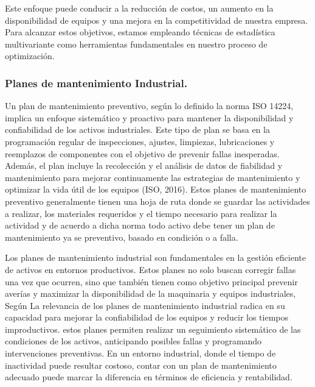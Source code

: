 \documentclass[
  11pt,
  bookmarksnumbered]{article}
\begin{document}
Este enfoque puede conducir a la reducción de costos, un aumento en la disponibilidad de equipos y una mejora en la competitividad de nuestra empresa.
Para alcanzar estos objetivos, estamos empleando técnicas de estadística multivariante como herramientas fundamentales en nuestro proceso de optimización.

\hypertarget{planes-de-mantenimiento-industrial.}{%
\subsubsection{Planes de mantenimiento Industrial.}\label{planes-de-mantenimiento-industrial.}}

Un plan de mantenimiento preventivo, según lo definido la norma ISO 14224, implica un enfoque sistemático y proactivo para mantener la disponibilidad y confiabilidad de los activos industriales.
Este tipo de plan se basa en la programación regular de inspecciones, ajustes, limpiezas, lubricaciones y reemplazos de componentes con el objetivo de prevenir fallas inesperadas.
Además, el plan incluye la recolección y el análisis de datos de fiabilidad y mantenimiento para mejorar continuamente las estrategias de mantenimiento y optimizar la vida útil de los equipos (ISO, 2016).
Estos planes de mantenimiento preventivo generalmente tienen una hoja de ruta donde se guardar las actividades a realizar, los materiales requeridos y el tiempo necesario para realizar la actividad y de acuerdo a dicha norma todo activo debe tener un plan de mantenimiento ya se preventivo, basado en condición o a falla.

Los planes de mantenimiento industrial son fundamentales en la gestión eficiente de activos en entornos productivos.
Estos planes no solo buscan corregir fallas una vez que ocurren, sino que también tienen como objetivo principal prevenir averías y maximizar la disponibilidad de la maquinaria y equipos industriales, Según \textcite{Martinez2020} La relevancia de los planes de mantenimiento industrial radica en su capacidad para mejorar la confiabilidad de los equipos y reducir los tiempos improductivos.
estos planes permiten realizar un seguimiento sistemático de las condiciones de los activos, anticipando posibles fallas y programando intervenciones preventivas.
En un entorno industrial, donde el tiempo de inactividad puede resultar costoso, contar con un plan de mantenimiento adecuado puede marcar la diferencia en términos de eficiencia y rentabilidad.
\end{document}
